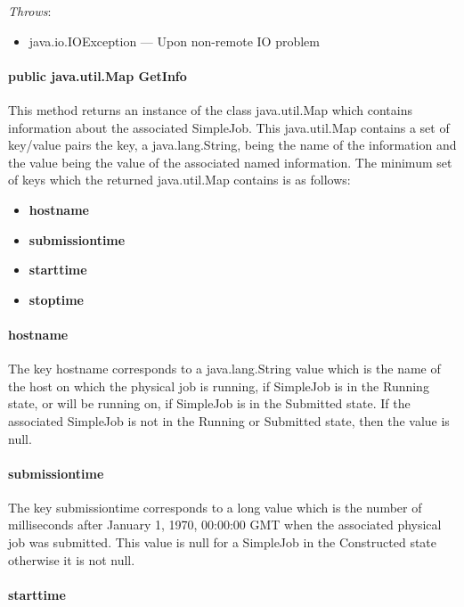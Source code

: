\documentclass[$Date: 2003/06/26 19:29:31 $]{glabarticle}
\begin{document}
\textit{Throws}:
\begin{itemize}
\item[] java.io.IOException --- Upon non-remote IO problem 
\end{itemize}

\paragraph{public java.util.Map GetInfo}

This method returns an instance of the class java.util.Map which contains
information about the associated SimpleJob. This java.util.Map contains a
set of key/value pairs the key, a java.lang.String, being the name of the
information and the value being the value of the associated named
information.  The minimum set of keys which the returned java.util.Map
contains is as follows:

\begin{itemize}
  \item \textbf{hostname}
  \item \textbf{submissiontime}
  \item \textbf{starttime}
  \item \textbf{stoptime}
\end{itemize}
\paragraph{hostname} 

The key hostname corresponds to a java.lang.String value which is the
name of the host on which the physical job is running, if SimpleJob is
in the Running state, or will be running on, if SimpleJob is in the
Submitted state. If the associated SimpleJob is not in the Running or
Submitted state, then the value is null.

\paragraph{submissiontime} 

The key submissiontime corresponds to a long value which is
the number of milliseconds after January 1, 1970, 00:00:00 GMT when
the associated physical job was submitted. This value is null for a
SimpleJob in the Constructed state otherwise it is not null.

\paragraph{starttime} 
\end{document}
